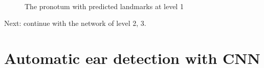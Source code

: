 \begin{figure}[h!]
\\
\caption{The pronotum with predicted landmarks at level 1}
\label{figcentroidSize}
\end{figure}

Next: continue with the network of level 2, 3.
\section{Automatic ear detection with CNN}
